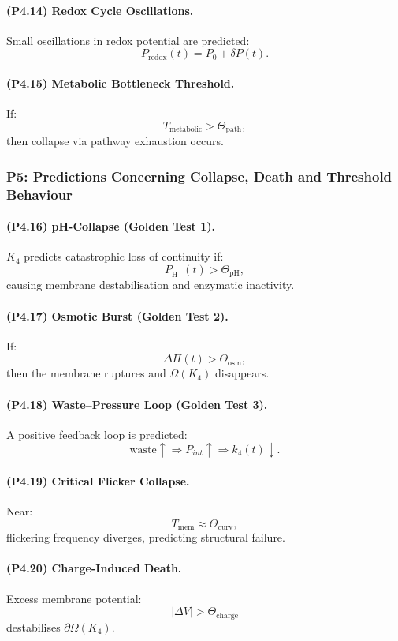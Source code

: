 \paragraph{(P4.14) Redox Cycle Oscillations.}
Small oscillations in redox potential are predicted:
\[
P_{\mathrm{redox}}(t) = P_0 + \delta P(t).
\]

\paragraph{(P4.15) Metabolic Bottleneck Threshold.}
If:
\[
T_{\mathrm{metabolic}} > \Theta_{\mathrm{path}},
\]
then collapse via pathway exhaustion occurs.

\subsubsection{P5: Predictions Concerning Collapse, Death and Threshold Behaviour}

\paragraph{(P4.16) pH-Collapse (Golden Test 1).}
$K_4$ predicts catastrophic loss of continuity if:
\[
P_{\mathrm{H}^+}(t) > \Theta_{\mathrm{pH}},
\]
causing membrane destabilisation and enzymatic inactivity.

\paragraph{(P4.17) Osmotic Burst (Golden Test 2).}
If:
\[
\Delta \Pi(t) > \Theta_{\mathrm{osm}},
\]
then the membrane ruptures and $\Omega(K_4)$ disappears.

\paragraph{(P4.18) Waste–Pressure Loop (Golden Test 3).}
A positive feedback loop is predicted:
\[
\text{waste} \uparrow \Rightarrow P_{int} \uparrow
\Rightarrow k_4(t) \downarrow.
\]

\paragraph{(P4.19) Critical Flicker Collapse.}
Near:
\[
T_{\mathrm{mem}} \approx \Theta_{\mathrm{curv}},
\]
flickering frequency diverges, predicting structural failure.

\paragraph{(P4.20) Charge-Induced Death.}
Excess membrane potential:
\[
|\Delta V| > \Theta_{\mathrm{charge}}
\]
destabilises $\partial\Omega(K_4)$.

